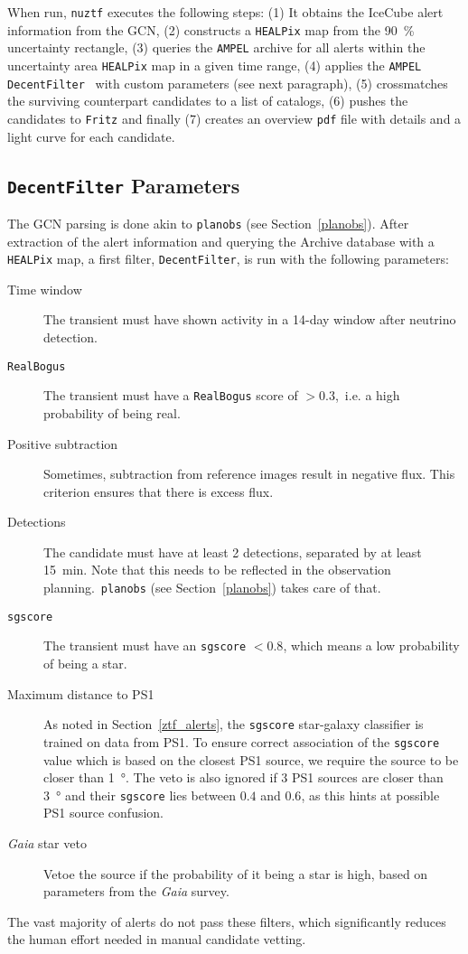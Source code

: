 When run, \texttt{nuztf} executes the following steps: (1) It obtains the IceCube alert information from the GCN, (2) constructs a \texttt{HEALPix} map from the \SI{90}{\percent} uncertainty rectangle, (3) queries the \texttt{AMPEL} archive for all alerts within the uncertainty area \texttt{HEALPix} map in a given time range, (4) applies the \texttt{AMPEL} \texttt{DecentFilter}~\cite{Nordin2019} with custom parameters (see next paragraph), (5) crossmatches the surviving counterpart candidates to a list of catalogs, (6) pushes the candidates to \texttt{Fritz} and finally (7) creates an overview \texttt{pdf} file with details and a light curve for each candidate.

\subsection{\texttt{DecentFilter} Parameters}
The GCN parsing is done akin to \texttt{planobs} (see Section~\ref{planobs}). After extraction of the alert information and querying the Archive database with a \texttt{HEALPix} map, a first filter, \texttt{DecentFilter}, is run with the following parameters:
\begin{description}
    \item[Time window] The transient must have shown activity in a 14-day window after neutrino detection.
    \item[\texttt{RealBogus}] The transient must have a \texttt{RealBogus} score of $>0.3$,~i.e. a high probability of being real.
    \item[Positive subtraction] Sometimes, subtraction from reference images result in negative flux. This criterion ensures that there is excess flux.
    \item[Detections] The candidate must have at least 2 detections, separated by at least \SI{15}{\minute}. Note that this needs to be reflected in the observation planning.\ \texttt{planobs} (see Section~\ref{planobs}) takes care of that.
    \item[\texttt{sgscore}] The transient must have an \texttt{sgscore} $<0.8$, which means a low probability of being a star.
    \item[Maximum distance to PS1] As noted in Section~\ref{ztf_alerts}, the \texttt{sgscore} star-galaxy classifier is trained on data from PS1. To ensure correct association of the \texttt{sgscore} value which is based on the closest PS1 source, we require the source to be closer than \SI{1}{\degree}. The veto is also ignored if 3 PS1 sources are closer than \SI{3}{\degree} and their \texttt{sgscore} lies between $0.4$ and $0.6$, as this hints at possible PS1 source confusion.
    \item[\textit{Gaia} star veto] Vetoe the source if the probability of it being a star is high, based on parameters from the \textit{Gaia} survey.
\end{description}
The vast majority of alerts do not pass these filters, which significantly reduces the human effort needed in manual candidate vetting.

